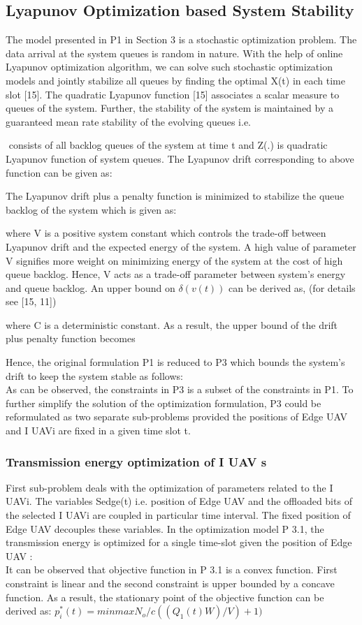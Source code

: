 \documentclass{article}
\begin{document}
\begin{multicols}{2}
\section{Lyapunov Optimization based System
Stability}
The model presented in P1 in Section 3 is a stochastic optimization
problem. The data arrival at the system queues
is random in nature. With the help of online Lyapunov
optimization algorithm, we can solve such stochastic optimization
models and jointly stabilize all queues by finding
the optimal X(t) in each time slot [15].
The quadratic Lyapunov function [15] associates a
scalar measure to queues of the system. Further, the stability
of the system is maintained by a guaranteed mean
rate stability of the evolving queues i.e. 

$ $ consists of all backlog queues of
the system at time t and Z(.) is quadratic Lyapunov function
of system queues.
The Lyapunov drift corresponding to above function
can be given as:

The Lyapunov drift plus a penalty function is minimized
to stabilize the queue backlog of the system which is given
as:

where V is a positive system constant which controls the
trade-off between Lyapunov drift and the expected energy
of the system. A high value of parameter V signifies more
weight on minimizing energy of the system at the cost of
high queue backlog. Hence, V acts as a trade-off parameter
between system’s energy and queue backlog.
An upper bound on $\delta(v(t))$ can be derived as, (for
details see [15, 11])

where C is a deterministic constant.
As a result, the upper bound of the drift plus penalty
function becomes

Hence, the original formulation P1 is reduced to P3 which
bounds the system’s drift to keep the system stable as
follows:
\[\]
As can be observed, the constraints in P3 is a subset of
the constraints in P1. To further simplify the solution of
the optimization formulation, P3 could be reformulated
as two separate sub-problems provided the positions of
Edge UAV and I UAVi are fixed in a given time slot t.
\subsubsection{Transmission energy optimization of
I UAV s}
First sub-problem deals with the optimization of parameters
related to the I UAVi. The variables Sedge(t) i.e. position of Edge UAV and the offloaded bits of the selected
I UAVi are coupled in particular time interval. The
fixed position of Edge UAV decouples these variables. In
the optimization model P 3.1, the transmission energy
is optimized for a single time-slot given the position of
Edge UAV : 
\[\]
It can be observed that objective function in P 3.1 is a
convex function. First constraint is linear and the second
constraint is upper bounded by a concave function.
As a result, the stationary point of the objective function
can be derived as: $p_i^*(t)=min{max{N_o/c((Q_1(t)W)/V)+1)}}$


\end{multicols}
\end{document}
